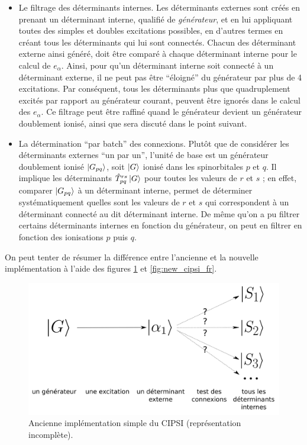 \documentclass[./thesis.tex]{subfiles}
\begin{document}
\begin{itemize}
\item
Le filtrage des déterminants internes. Les déterminants externes sont créés en prenant un déterminant interne, qualifié de \emph{générateur}, et en lui appliquant toutes des simples et doubles excitations possibles, en d'autres termes en créant tous les déterminants qui lui sont connectés. Chacun des déterminant externe ainsi généré, doit être comparé à chaque déterminant interne pour le calcul de $e_\alpha$. Ainsi, pour qu'un déterminant interne soit connecté à un déterminant externe, il ne peut pas être ``éloigné'' du générateur par plus de 4 excitations. Par conséquent, tous les déterminants plus que quadruplement excités par rapport au générateur courant, peuvent être ignorés dans le calcul des $e_\alpha$. Ce filtrage peut être raffiné quand le générateur devient un générateur doublement ionisé, ainsi que sera discuté dans le point suivant.
\item
La détermination ``par batch'' des connexions. 
Plutôt que de considérer les déterminants externes ``un par un'', l'unité de base est un générateur doublement ionisé $\ket {G_{pq}}$, soit $\ket G$ ionisé dans les spinorbitales $p$ et $q$. Il implique les déterminants $\hat T_{pq}^{rs} \ket G$ pour toutes les valeurs de $r$ et $s$ ; en effet, comparer $\ket {G_{pq}}$ à un déterminant interne, permet de déterminer systématiquement quelles sont les valeurs de $r$ et $s$ qui correspondent à un déterminant connecté au dit déterminant interne.
De même qu'on a pu filtrer certains déterminants internes en fonction du générateur, on peut en filtrer en fonction des ionisations $p$ puis $q$.
\end{itemize}
On peut tenter de résumer la différence entre l'ancienne et la nouvelle implémentation à l'aide des figures \ref{fig:old_cipsi_fr} et \ref{fig:new_cipsi_fr}.
\begin{figure}[h!]
        \begin{center}
                \includegraphics[width=0.6\columnwidth]{figures/cipsi/old_cipsi_fr}
        \end{center}
        \caption{Ancienne implémentation simple du CIPSI (représentation incomplète).}
        \label{fig:old_cipsi_fr}
\end{figure}
\end{document}

